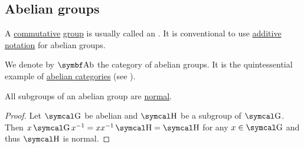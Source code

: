 \subsection{Abelian groups}\label{subsec:abelian_groups}

\begin{definition}\label{def:abelian_group}
  A \hyperref[def:magma/commutative]{commutative} \hyperref[def:group]{group} is usually called an . It is conventional to use \hyperref[rem:additive_magma]{additive notation} for abelian groups.

  We denote by \( \Cat{Ab} \) the category of abelian groups. It is the quintessential example of \hyperref[def:abelian_category]{abelian categories} (see ).
\end{definition}

\begin{proposition}\label{thm:abelian_normal_subgroups}
  All subgroups of an abelian group are \hyperref[def:normal_subgroup]{normal}.
\end{proposition}
\begin{proof}
  Let \( \CG \) be abelian and \( \CH \) be a subgroup of \( \CG \). Then \( x \CG x^{-1} = xx^{-1} \CH = \CH \) for any \( x \in \CG \) and thus \( \CH \) is normal.
\end{proof}

